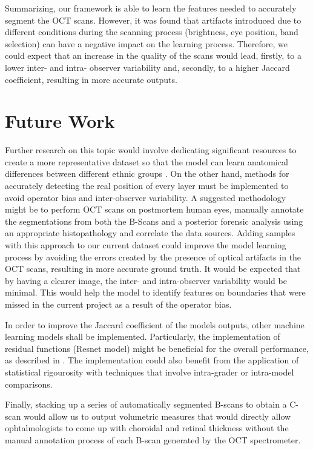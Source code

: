 \documentclass[12pt,a4paper]{scrartcl}
\begin{document}
Summarizing, our framework is able to learn the features needed to accurately segment the OCT scans. However, it was found that artifacts introduced due to different conditions during the scanning process (brightness, eye position, band selection) can have a negative impact on the learning process. Therefore, we could expect that an increase in the  quality of the scans would lead, firstly, to a lower inter- and intra- observer variability and, secondly, to a higher Jaccard coefficient, resulting in more accurate outputs.



\section{Future Work}

Further research on this topic would involve dedicating significant resources to create a more representative dataset so that the model can learn anatomical differences between different ethnic groups \cite{Consejo2020, Lin2009}. On the other hand, methods for accurately detecting the real position of every layer must be implemented to avoid operator bias and inter-observer variability. A suggested methodology might be to perform OCT scans on postmortem human eyes, manually annotate the segmentations from both the B-Scans and a posterior forensic analysis using an appropriate histopathology \cite{IOVINO2017, Mcnabb2009, Nioi2019} and correlate the data sources. Adding samples with this approach to our current dataset could improve the model learning process by avoiding the errors created by the presence of optical artifacts in the OCT scans, resulting in more accurate ground truth. It would be expected that by having a clearer image, the inter- and intra-observer variability would be minimal. This would help the model to identify features on boundaries that were missed in the current project as a result of the operator bias.

In order to improve the Jaccard coefficient of the models outputs, other machine learning models shall be implemented. Particularly, the implementation of residual functions (Resnet model) might be beneficial for the overall performance, as described in \cite{He2015, Zheng2020}. The implementation could also benefit from the application of statistical rigourosity with techniques that involve intra-grader or intra-model comparisons. 

Finally, stacking up a series of automatically segmented B-scans to obtain a C-scan would allow us to output volumetric measures that would directly allow ophtalmologists to come up with choroidal and retinal thickness without the manual annotation process of each B-scan generated by the OCT spectrometer. 
\end{document}
